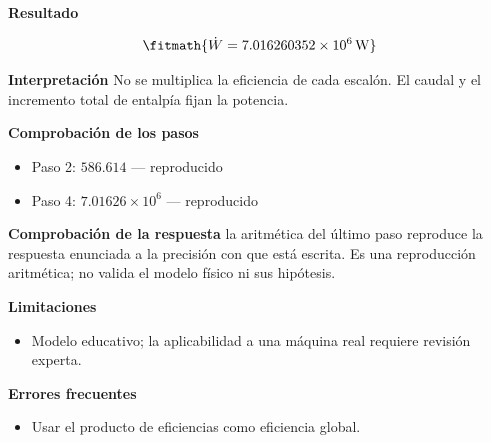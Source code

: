 \documentclass[10pt,openany]{book}
\begin{document}
\begin{tcolorbox}[title={Problema resuelto 1}, studiumworked, breakable]
\noindent\textbf{Resultado}

\[
\fitmath{\dot{W}=7.016260352\times10^{6}\,\mathrm{W}}
\]

\noindent\textbf{Interpretación}
No se multiplica la eficiencia de cada escalón. El caudal y el incremento total de entalpía fijan la potencia.

\noindent\textbf{Comprobación de los pasos}
\begin{itemize}
\item Paso 2: $586.614$ — reproducido
\item Paso 4: $7.01626\times 10^{6}$ — reproducido
\end{itemize}

\noindent\textbf{Comprobación de la respuesta} la aritmética del último paso reproduce la respuesta enunciada a la precisión con que está escrita. Es una reproducción aritmética; no valida el modelo físico ni sus hipótesis.

\noindent\textbf{Limitaciones}
\begin{itemize}
\item Modelo educativo; la aplicabilidad a una máquina real requiere revisión experta.
\end{itemize}

\noindent\textbf{Errores frecuentes}
\begin{itemize}
\item Usar el producto de eficiencias como eficiencia global.
\end{itemize}
\end{tcolorbox}
\end{document}
